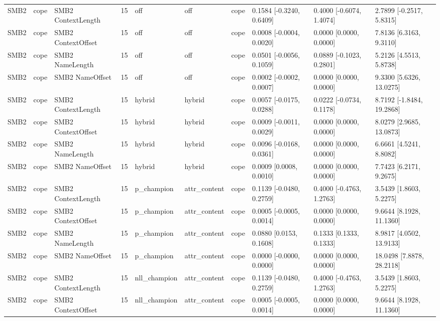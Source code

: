 \begin{tabular}{llllllllll}
SMB2 & cope & SMB2 ContextLength & 15 & off & off & cope & 0.1584 [-0.3240, 0.6409] & 0.4000 [-0.6074, 1.4074] & 2.7899 [-0.2517, 5.8315] \\
SMB2 & cope & SMB2 ContextOffset & 15 & off & off & cope & 0.0008 [-0.0004, 0.0020] & 0.0000 [0.0000, 0.0000] & 7.8136 [6.3163, 9.3110] \\
SMB2 & cope & SMB2 NameLength & 15 & off & off & cope & 0.0501 [-0.0056, 0.1059] & 0.0889 [-0.1023, 0.2801] & 5.2126 [4.5513, 5.8738] \\
SMB2 & cope & SMB2 NameOffset & 15 & off & off & cope & 0.0002 [-0.0002, 0.0007] & 0.0000 [0.0000, 0.0000] & 9.3300 [5.6326, 13.0275] \\
SMB2 & cope & SMB2 ContextLength & 15 & hybrid & hybrid & cope & 0.0057 [-0.0175, 0.0288] & 0.0222 [-0.0734, 0.1178] & 8.7192 [-1.8484, 19.2868] \\
SMB2 & cope & SMB2 ContextOffset & 15 & hybrid & hybrid & cope & 0.0009 [-0.0011, 0.0029] & 0.0000 [0.0000, 0.0000] & 8.0279 [2.9685, 13.0873] \\
SMB2 & cope & SMB2 NameLength & 15 & hybrid & hybrid & cope & 0.0096 [-0.0168, 0.0361] & 0.0000 [0.0000, 0.0000] & 6.6661 [4.5241, 8.8082] \\
SMB2 & cope & SMB2 NameOffset & 15 & hybrid & hybrid & cope & 0.0009 [0.0008, 0.0010] & 0.0000 [0.0000, 0.0000] & 7.7423 [6.2171, 9.2675] \\
SMB2 & cope & SMB2 ContextLength & 15 & p\_champion & attr\_content & cope & 0.1139 [-0.0480, 0.2759] & 0.4000 [-0.4763, 1.2763] & 3.5439 [1.8603, 5.2275] \\
SMB2 & cope & SMB2 ContextOffset & 15 & p\_champion & attr\_content & cope & 0.0005 [-0.0005, 0.0014] & 0.0000 [0.0000, 0.0000] & 9.6644 [8.1928, 11.1360] \\
SMB2 & cope & SMB2 NameLength & 15 & p\_champion & attr\_content & cope & 0.0880 [0.0153, 0.1608] & 0.1333 [0.1333, 0.1333] & 8.9817 [4.0502, 13.9133] \\
SMB2 & cope & SMB2 NameOffset & 15 & p\_champion & attr\_content & cope & 0.0000 [-0.0000, 0.0000] & 0.0000 [0.0000, 0.0000] & 18.0498 [7.8878, 28.2118] \\
SMB2 & cope & SMB2 ContextLength & 15 & nll\_champion & attr\_content & cope & 0.1139 [-0.0480, 0.2759] & 0.4000 [-0.4763, 1.2763] & 3.5439 [1.8603, 5.2275] \\
SMB2 & cope & SMB2 ContextOffset & 15 & nll\_champion & attr\_content & cope & 0.0005 [-0.0005, 0.0014] & 0.0000 [0.0000, 0.0000] & 9.6644 [8.1928, 11.1360] \\

\end{tabular}
